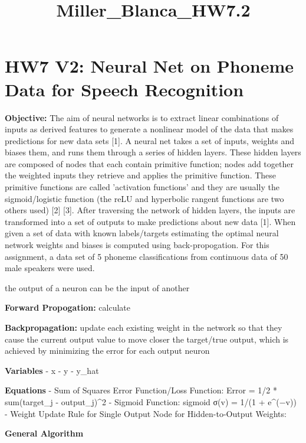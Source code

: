 \documentclass[11pt]{article}
\title{Miller\_Blanca\_HW7.2}
\begin{document}
    
    
    \maketitle
    
    

    
    \section{HW7 V2: Neural Net on Phoneme Data for Speech
Recognition}\label{hw7-v2-neural-net-on-phoneme-data-for-speech-recognition}

    \textbf{Objective:} The aim of neural networks is to extract linear
combinations of inputs as derived features to generate a nonlinear model
of the data that makes predictions for new data sets {[}1{]}. A neural
net takes a set of inputs, weights and biases them, and runs them
through a series of hidden layers. These hidden layers are composed of
nodes that each contain primitive function; nodes add together the
weighted inputs they retrieve and applies the primitive function. These
primitive functions are called 'activation functions' and they are
usually the sigmoid/logistic function (the reLU and hyperbolic rangent
functions are two others used) {[}2{]} {[}3{]}. After traversing the
network of hidden layers, the inputs are transformed into a set of
outputs to make predictions about new data {[}1{]}. When given a set of
data with known labels/targets estimating the optimal neural network
weights and biases is computed using back-propogation. For this
assignment, a data set of 5 phoneme classifications from continuous data
of 50 male speakers were used.

the output of a neuron can be the input of another

\textbf{Forward Propogation:} calculate

\textbf{Backpropagation:} update each existing weight in the network so
that they cause the current output value to move closer the target/true
output, which is achieved by minimizing the error for each output neuron

    \textbf{Variables} - x - y - y\_hat

\textbf{Equations} - Sum of Squares Error Function/Loss Function: Error
= 1/2 * sum(target\_j - output\_j)\^{}2 - Sigmoid Function: sigmoid σ(v)
= 1/(1 + e\^{}(−v)) - Weight Update Rule for Single Output Node for
Hidden-to-Output Weights:

\textbf{General Algorithm}
\end{document}
